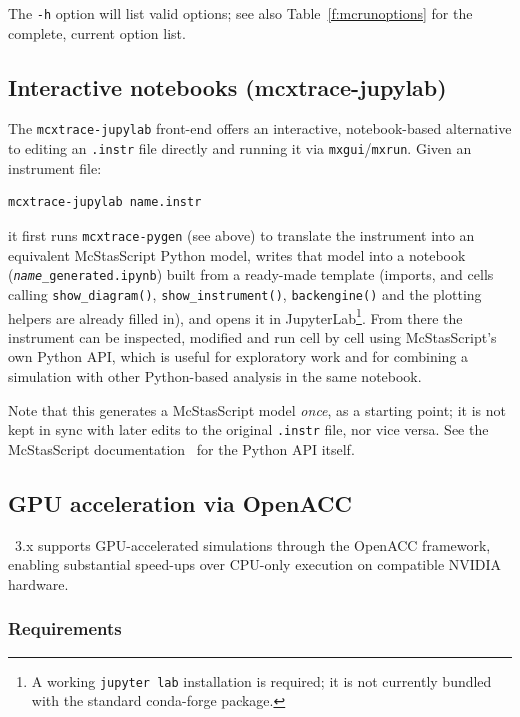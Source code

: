 The \verb+-h+ option will list valid options; see also Table~\ref{f:mcrunoptions}
for the complete, current option list.

\subsection{Interactive notebooks (mcxtrace-jupylab)}
\label{s:jupylab}

The \texttt{mcxtrace-jupylab} front-end offers an interactive,
notebook-based alternative to editing an \texttt{.instr} file directly
and running it via \texttt{mxgui}/\texttt{mxrun}. Given an instrument
file:
\begin{lstlisting}
mcxtrace-jupylab name.instr
\end{lstlisting}
it first runs \texttt{mcxtrace-pygen} (see above) to translate the
instrument into an equivalent McStasScript Python model, writes that
model into a notebook (\texttt{\textit{name}\_generated.ipynb}) built
from a ready-made template (imports, and cells calling
\texttt{show\_diagram()}, \texttt{show\_instrument()}, \texttt{backengine()}
and the plotting helpers are already filled in), and opens it in
JupyterLab\footnote{A working
\texttt{jupyter lab} installation is required; it is not currently
bundled with the standard conda-forge \MCX package.}. From there the
instrument can be inspected, modified and run cell by cell using
McStasScript's own Python API, which is useful for exploratory work and
for combining a simulation with other Python-based analysis in the same
notebook.

Note that this generates a McStasScript model \emph{once}, as a
starting point; it is not kept in sync with later edits to the original
\texttt{.instr} file, nor vice versa. See the McStasScript
documentation~\cite{mcstasscript} for the Python API itself.

\subsection{GPU acceleration via OpenACC}
\label{s:gpu}

\MCX~3.x supports GPU-accelerated simulations through the OpenACC
framework, enabling substantial speed-ups over CPU-only execution on
compatible NVIDIA hardware.

\subsubsection{Requirements}

